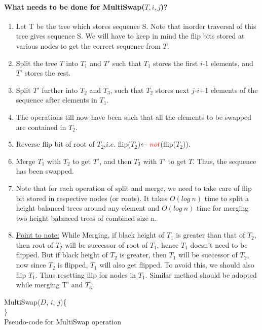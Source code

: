 \documentclass[pdftex,a4paper,12pt]{report}
\begin{document}
\paragraph{What needs to be done for MultiSwap($T, i, j$)?}
\begin{enumerate}
	\item Let T be the tree which stores sequence S. Note that inorder traversal of this tree gives sequence S.
	We will have to keep in mind the flip bits stored at various nodes to get the correct sequence from $T$.
	\item Split the tree $T$ into $T_1$ and $T'$ such that $T_1$ stores the first $i$-1 elements, and $T'$
	stores the rest.
	\item Split $T'$ further into $T_2$ and $T_3$, such that $T_2$ stores next $j$-$i$+1 elements of the sequence 
	after elements in $T_1$.
	\item The operations till now have been such that all the elements to be swapped are contained in $T_2$.
	\item Reverse flip bit of root of $T_2$,$i.e.$ flip($T_2$)$\gets \textcolor{red}{not}$(flip($T_2$)).
	\item Merge $T_1$ with $T_2$ to get $T'$, and then $T_3$ with $T'$ to get $T$. Thus, the sequence has
	been swapped.
	\item Note that for each operation of split and merge, we need to take care of flip bit stored in respective 
	nodes (or roots). It takes $O(log\ n)$ time to split a height balanced trees around any element and $O(log\ n)$ 
	time for merging two height balanced trees of combined size n.
	\item \underline{Point to note:} While Merging, if black height of $T_1$ is greater than that of $T_2$, then root of $T_2$ 
	will be successor of root of $T_1$, hence $T_1$ doesn't need to be flipped. But if black height of $T_2$ is greater, 
	then $T_1$ will be successor of $T_2$, now since $T_2$ is flipped, $T_1$ will also get flipped. To avoid this, we should 
	also flip $T_1$. Thus resetting flip for nodes in $T_1$. Similar method should be adopted while merging T' and $T_3$.
\end{enumerate}

\begin{algorithm}
MultiSwap($D$, $i$, $j$)\{\\
\}\\

\caption{Pseudo-code for MultiSwap operation}
\end{algorithm}
\end{document}
